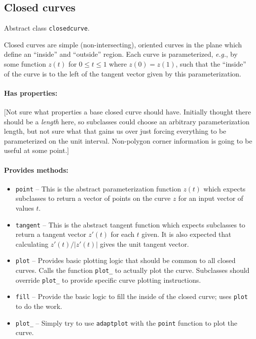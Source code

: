 \documentclass{article}
\newcommand{\code}[1]{\texttt{#1}}
\begin{document}
\subsection{Closed curves}
Abstract class \code{closedcurve}.

Closed curves are simple (non-intersecting), oriented curves in the plane which define an ``inside'' and ``outside'' region. Each curve is parameterized, \textit{e.g.}, by some function $z(t)$ for $0\le t\le 1$ where $z(0) = z(1)$, such that the ``inside'' of the curve is to the left of the tangent vector given by this parameterization.

\paragraph{Has properties:} [Not sure what properties a base closed curve should have. Initially thought there should be a \emph{length} here, so subclasses could choose an arbitrary parameterization length, but not sure what that gains us over just forcing everything to be parameterized on the unit interval. Non-polygon corner information is going to be useful at some point.]

\paragraph{Provides methods:}
\begin{itemize}
  \item \code{point} -- This is the abstract parameterization function $z(t)$ which expects subclasses to return a vector of points on the curve $z$ for an input vector of values $t$.
  \item \code{tangent} -- This is the abstract tangent function which expects subclasses to return a tangent vector $z'(t)$ for each $t$ given. It is also expected that calculating $z'(t)/|z'(t)|$ gives the unit tangent vector.
  \item \code{plot} -- Provides basic plotting logic that should be common to all closed curves. Calls the function \code{plot\_} to actually plot the curve. Subclasses should override \code{plot\_} to provide specific curve plotting instructions.
  \item \code{fill} -- Provide the basic logic to fill the inside of the closed curve; uses \code{plot} to do the work.
  \item \code{plot\_} -- Simply try to use \code{adaptplot} with the \code{point} function to plot the curve.
\end{itemize}
\end{document}
